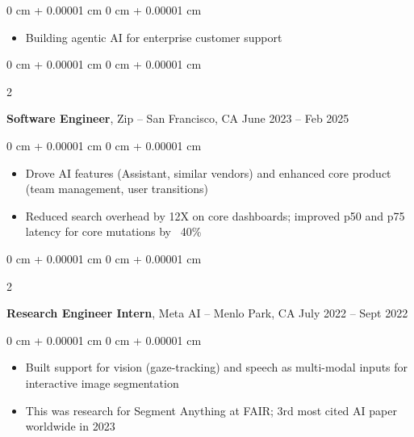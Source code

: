 \documentclass[10pt, letterpaper]{article}
\newenvironment{highlights}{
    \begin{itemize}[
        topsep=0.10 cm,
        parsep=0.10 cm,
        partopsep=0pt,
        itemsep=0pt,
        leftmargin=0 cm + 10pt
    ]
}{
    \end{itemize}
} %
\newenvironment{onecolentry}{
    \begin{adjustwidth}{
        0 cm + 0.00001 cm
    }{
        0 cm + 0.00001 cm
    }
}{
    \end{adjustwidth}
} %
\newenvironment{twocolentry}[2][]{
    \onecolentry
    \def\secondColumn{#2}
    \setcolumnwidth{\fill, 4.5 cm}
    \begin{paracol}{2}
}{
    \switchcolumn \raggedleft \secondColumn
    \end{paracol}
    \endonecolentry
} %
\begin{document}
        \vspace{0.10 cm}
        \begin{onecolentry}
            \begin{highlights}
                \item Building agentic AI for enterprise customer support 
            \end{highlights}
        \end{onecolentry}


        \vspace{0.2 cm}

        
        \begin{twocolentry}{
            June 2023 – Feb 2025
        }
            \textbf{Software Engineer}, Zip -- San Francisco, CA\end{twocolentry}

        \vspace{0.10 cm}
        \begin{onecolentry}
            \begin{highlights}
                \item Drove AI features (Assistant, similar vendors) and enhanced core product (team management, user transitions)
                \item Reduced search overhead by 12X on core dashboards; improved p50 and p75 latency for core mutations by ~40\%
            \end{highlights}
        \end{onecolentry}


        \vspace{0.2 cm}

        \begin{twocolentry}{
            July 2022 – Sept 2022
        }
            \textbf{Research Engineer Intern}, Meta AI -- Menlo Park, CA\end{twocolentry}

        \vspace{0.10 cm}
        \begin{onecolentry}
            \begin{highlights}
                \item Built support for vision (gaze-tracking) and speech as  multi-modal inputs for interactive image segmentation
                \item This was research for Segment Anything at FAIR; 3rd most cited AI paper worldwide in 2023
            \end{highlights}
        \end{onecolentry}
\end{document}
